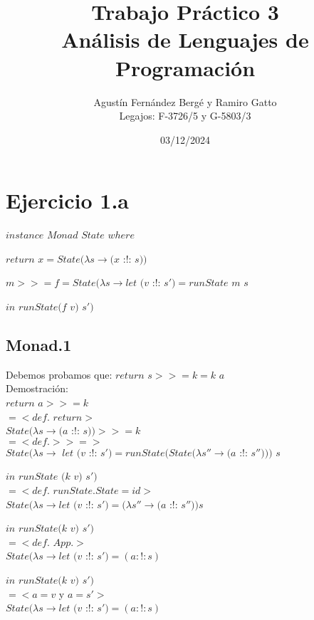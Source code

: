 \documentclass[12pt, titlepage]{article}
\title{Trabajo Práctico 3\\ 
Análisis de Lenguajes de Programación}
\author{Agustín Fernández Bergé y Ramiro Gatto\\ Legajos: F-3726/5 y G-5803/3}
\date{03/12/2024}
\begin{document}
\maketitle

\section*{Ejercicio 1.a}

\noindent $instance$ $Monad$ $State$ $where$

\hspace{15pt}$return$ $x = State (\lambda s \rightarrow (x$ :!: $s))$

\hspace{15pt}$m >>= f = State (\lambda s \rightarrow let$ $(v$ :!: $s') = runState$ $m$ $s$

\hspace{145pt}$in$ $runState (f$ $v)$ $s')$


\subsection*{Monad.1}
Debemos probamos que: $return$ $s >>= k = k$ $a$\\
Demostración:\\
$return$ $a >>= k$\\
$= <def.$ $return >$\\
$State (\lambda s \rightarrow  (a$ :!: $s)) >>= k$ \\
$= < def. >>= >$\\
$State (\lambda s \rightarrow$ 
$let$ $(v$ :!: $s') = runState (State (\lambda s'' \rightarrow (a $ :!: $ s'')))$ $s$

\hspace{45pt} $in$ $runState$ $(k$ $v)$ $s')$\\
$=< def.$ $runState.State = id >$ \\
$State (\lambda s \rightarrow let$ $(v$ :!: $s') = (\lambda s'' \rightarrow  (a$ :!: $s'')) s$

\hspace{45pt} $in$ $runState (k$ $v)$ $s')$\\
$= < def.$ $App. >$\\
$State (\lambda s \rightarrow let$ $(v$ :!: $s') = (a :!: s)$

\hspace{45pt} $in$ $runState (k$ $v)$ $s')$\\
$= <a=v$ y $a=s'>$\\
$State (\lambda s \rightarrow let$ $(v$ :!: $s') = (a :!: s)$
\end{document}
